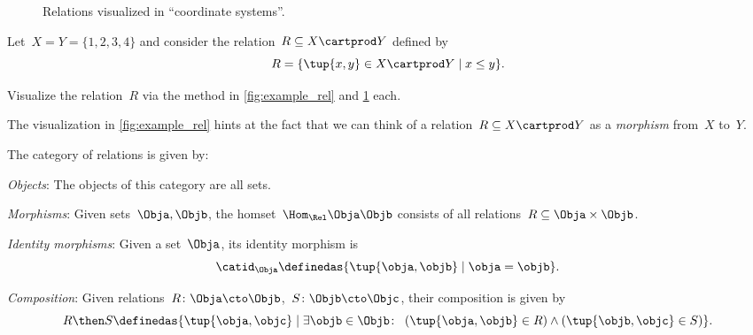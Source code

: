 \begin{figure}[h!]
  \begin{center}
  \end{center}
  \caption{Relations visualized in ``coordinate systems''.}
  \label{fig:example_rel_coord}
\end{figure}

\begin{exercise}
  Let~$X = Y = \{1, 2, 3, 4 \}$ and consider the relation~$R \subseteq X \cartprod Y$ defined by
  \begin{equation}
    R = \{ \tup{x,y} \in X \cartprod Y \mid x \leq y \}.
  \end{equation}

  Visualize the relation~$R$ via the method in \cref{fig:example_rel} and \cref{fig:example_rel_coord} each.
\end{exercise}

The visualization in \cref{fig:example_rel} hints at the fact that we can think of a relation~$R \subseteq X \cartprod Y$ as a \emph{morphism} from~$X$ to~$Y$.

\begin{ctdefinition}
  \label{def:Rel}
  The category \iindex{\Rel} of relations \Rel is given by:
  \begin{compactenum}
    \item \emph{Objects}: The objects of this category are all sets.
    \item \emph{Morphisms}: Given sets~$\Obja, \Objb$, the homset~$\Hom_{\Rel}{\Obja}{\Objb}$ consists of all
    relations~$R\subseteq \Obja\times \Objb$.
    \item \emph{Identity morphisms}: Given a set~$\Obja$, its identity morphism is
    \begin{equation}
      \catid_\Obja \definedas \{ \tup{\obja,\objb} \mid  \obja = \objb \}.
    \end{equation}
    \item \emph{Composition}: Given relations~$R \colon \Obja\cto \Objb$,~$S\colon \Objb\cto \Objc$, their composition is given by
    \begin{equation}
      \label{eq:RelCompRule}
      R \then S \definedas \{\tup{\obja,\objc} \mid  \exists \objb \in \Objb \colon \ \left(\tup{\obja,\objb} \in R\right) \wedge \left(\tup{\objb,\objc} \in S\right)\}.
    \end{equation}
  \end{compactenum}
\end{ctdefinition}

